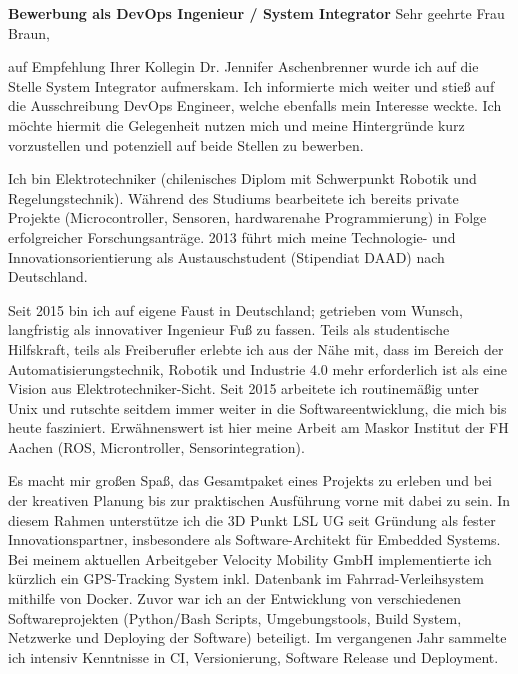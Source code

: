 \documentclass[a4paper,10pt]{article}
\begin{document}
\begin{page}{\textwidth}
\textbf{Bewerbung als DevOps Ingenieur / System Integrator} \vfill
Sehr geehrte Frau Braun,\vfill

auf Empfehlung Ihrer Kollegin Dr. Jennifer Aschenbrenner wurde ich auf die Stelle System Integrator aufmerskam. Ich informierte mich weiter und stieß auf die Ausschreibung DevOps Engineer, welche ebenfalls mein Interesse weckte. Ich möchte hiermit die Gelegenheit nutzen mich und meine Hintergründe kurz vorzustellen und potenziell auf beide Stellen zu bewerben. 

Ich bin Elektrotechniker (chilenisches Diplom mit Schwerpunkt Robotik und Regelungstechnik). Während des Studiums bearbeitete ich bereits private Projekte (Microcontroller, Sensoren, hardwarenahe Programmierung) in Folge erfolgreicher Forschungsanträge. 2013 führt mich meine Technologie- und Innovationsorientierung als Austauschstudent (Stipendiat DAAD) nach Deutschland.\vfill

Seit 2015 bin ich auf eigene Faust in Deutschland; getrieben vom Wunsch, langfristig als innovativer Ingenieur Fuß zu fassen. Teils als studentische Hilfskraft, teils als Freiberufler erlebte ich aus der Nähe mit, dass im Bereich der Automatisierungstechnik, Robotik und Industrie 4.0 mehr erforderlich ist als eine Vision aus Elektrotechniker-Sicht. Seit 2015 arbeitete ich routinemäßig unter Unix und rutschte seitdem immer weiter in die Softwareentwicklung, die mich bis heute fasziniert. Erwähnenswert ist hier meine Arbeit am Maskor Institut der FH Aachen (ROS, Microntroller, Sensorintegration). \vfill
 
Es macht mir großen Spaß, das Gesamtpaket eines Projekts zu erleben und bei der kreativen Planung bis zur praktischen Ausführung vorne mit dabei zu sein. In diesem Rahmen unterstütze ich die 3D Punkt LSL UG seit Gründung als fester Innovationspartner, insbesondere als Software-Architekt für Embedded Systems. Bei meinem aktuellen Arbeitgeber Velocity Mobility GmbH implementierte ich kürzlich ein GPS-Tracking System inkl. Datenbank im Fahrrad-Verleihsystem mithilfe von Docker. Zuvor war ich an der Entwicklung von verschiedenen Softwareprojekten (Python/Bash Scripts, Umgebungstools, Build System, Netzwerke und Deploying der Software) beteiligt. Im vergangenen Jahr sammelte ich intensiv Kenntnisse in CI, Versionierung, Software Release und Deployment.  \vfill


\end{page}
\end{document}
